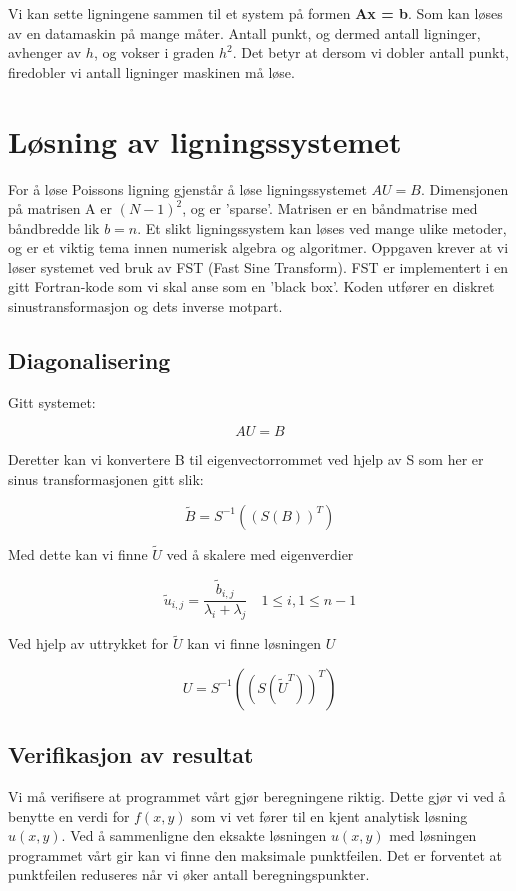 \documentclass[11pt,norsk,a4paper]{article}
\begin{document}
Vi kan sette ligningene sammen til et system på formen \textbf{Ax = b}. Som kan løses av en datamaskin på mange måter. Antall punkt, og dermed antall ligninger, avhenger av $h$, og vokser i graden $h^2$. Det betyr at dersom vi dobler antall punkt, firedobler vi antall ligninger maskinen må løse. 

\section{Løsning av ligningssystemet}

For å løse Poissons ligning gjenstår å løse ligningssystemet $AU=B$. Dimensjonen på matrisen A er $(N-1)^2$, og er 'sparse'. Matrisen er en båndmatrise med båndbredde lik $b=n$. Et slikt ligningssystem kan løses ved mange ulike metoder, og er et viktig tema innen numerisk algebra og algoritmer. Oppgaven krever at vi løser systemet ved bruk av FST (Fast Sine Transform). FST er implementert i en gitt Fortran-kode som vi skal anse som en 'black box'. Koden utfører en diskret sinustransformasjon og dets inverse motpart.

\subsection{Diagonalisering}

Gitt systemet:

$$ AU=B $$

Deretter kan vi konvertere B til eigenvectorrommet ved hjelp av S som her er sinus transformasjonen gitt slik:

$$ \widetilde{B} = S^{-1}((S(B))^T) $$

Med dette kan vi finne $\widetilde{U}$ ved å skalere med eigenverdier

$$ \widetilde{u}_{i,j} = \frac{\widetilde{b}_{i,j}}{\lambda_{i}+\lambda_{j}} \quad 1 \leq i,1 \leq n-1 $$

Ved hjelp av uttrykket for $\widetilde{U}$ kan vi finne løsningen $U$

$$ U = S^{-1}((S(\widetilde{U}^T))^T) $$

\subsection{Verifikasjon av resultat}

Vi må verifisere at programmet vårt gjør beregningene riktig. Dette gjør vi ved å benytte en verdi for $f(x,y)$ som vi vet fører til en kjent analytisk løsning $u(x,y)$. Ved å sammenligne den eksakte løsningen $u(x,y)$ med løsningen programmet vårt gir kan vi finne den maksimale punktfeilen. Det er forventet at punktfeilen reduseres når vi øker antall beregningspunkter. 
\end{document}
